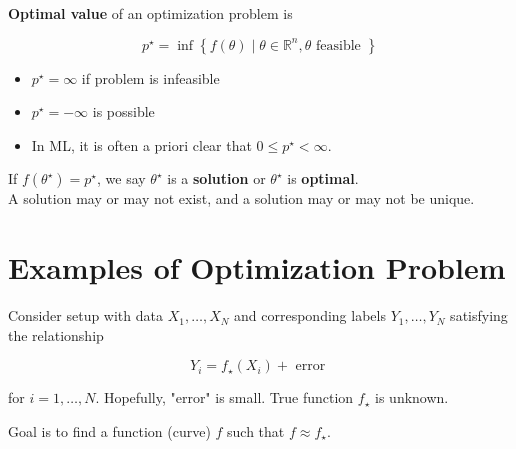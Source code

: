 \begin{definition}
    \textbf{Optimal value} of an optimization problem is

    $$
    p^{\star}=\inf \left\{f(\theta) \mid \theta \in \mathbb{R}^{n}, \theta \text { feasible }\right\}
    $$

    \begin{itemize}
        \item $p^{\star}=\infty$ if problem is infeasible
        \item $p^{\star}=-\infty$ is possible
        \item In ML, it is often a priori clear that $0 \leq p^{\star}<\infty$.
    \end{itemize}

    If $f\left(\theta^{\star}\right)=p^{\star}$, we say $\theta^{\star}$ is a \textbf{solution} or $\theta^{\star}$ is \textbf{optimal}.\\
    A solution may or may not exist, and a solution may or may not be unique.
\end{definition}

\section{Examples of Optimization Problem}

\begin{example}
    Consider setup with data $X_{1}, \ldots, X_{N}$ and corresponding labels $Y_{1}, \ldots, Y_{N}$ satisfying the relationship

    $$
    Y_{i}=f_{\star}\left(X_{i}\right)+\text { error }
    $$

    for $i=1, \ldots, N$. Hopefully, "error" is small. True function $f_{\star}$ is unknown.

    Goal is to find a function (curve) $f$ such that $f \approx f_{\star}$.
\end{example}

